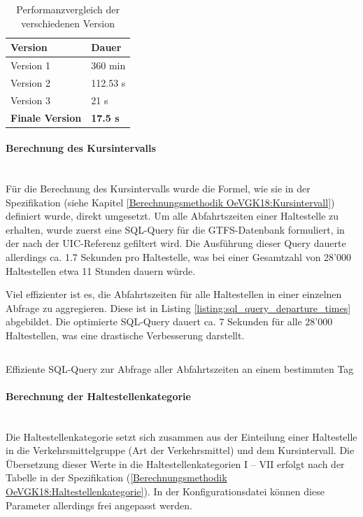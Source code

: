 \begin{table}[ht]
    \centering
    \begin{tabular}[ht]{l l}
        \toprule
        \textbf{Version} 
                                & \textbf{Dauer}\\
        \midrule
        Version 1
                                & 360 min\\
        Version 2
                                & 112.53 s\\
        Version 3
                                & 21 s\\
        \textbf{Finale Version}
                                & \textbf{17.5 s}\\            
        \bottomrule
    \end{tabular}
    \caption{Performanzvergleich der verschiedenen Version}
    \label{table:Performanzvergleich der verschiedenen Version}
\end{table}

\paragraph{Berechnung des Kursintervalls}~\\
Für die Berechnung des Kursintervalls wurde die Formel, wie sie in der Spezifikation (siehe Kapitel \ref{Berechnungsmethodik OeVGK18:Kursintervall}) definiert wurde, direkt umgesetzt.
Um alle Abfahrtszeiten einer Haltestelle zu erhalten, wurde zuerst eine SQL-Query für die GTFS-Datenbank formuliert, in der nach der \acs{UIC}-Referenz gefiltert wird.
Die Ausführung dieser Query dauerte allerdings ca. 1.7 Sekunden pro Haltestelle, was bei einer Gesamtzahl von 28'000 Haltestellen etwa 11 Stunden dauern würde.

Viel effizienter ist es, die Abfahrtszeiten für alle Haltestellen in einer einzelnen Abfrage zu aggregieren.
Diese ist in Listing \ref{listing:sql_query_departure_times} abgebildet.
Die optimierte SQL-Query dauert ca. 7 Sekunden für alle 28'000 Haltestellen, was eine drastische Verbesserung darstellt.

\begin{listing}[ht]
    \inputminted{sql}{projectdoc/listing/departure_time_cte.sql}
    \caption{Effiziente SQL-Query zur Abfrage aller Abfahrtszeiten an einem bestimmten Tag}
    \label{listing:sql_query_departure_times}
\end{listing}

\paragraph{Berechnung der Haltestellenkategorie}~\\
Die Haltestellenkategorie setzt sich zusammen aus der Einteilung einer Haltestelle in die Verkehrsmittelgruppe (Art der Verkehrsmittel) und dem Kursintervall.
Die Übersetzung dieser Werte in die Haltestellenkategorien  I -- VII erfolgt nach der Tabelle in der Spezifikation (\ref{Berechnungsmethodik OeVGK18:Haltestellenkategorie}).
In der Konfigurationsdatei können diese Parameter allerdings frei angepasst werden.

